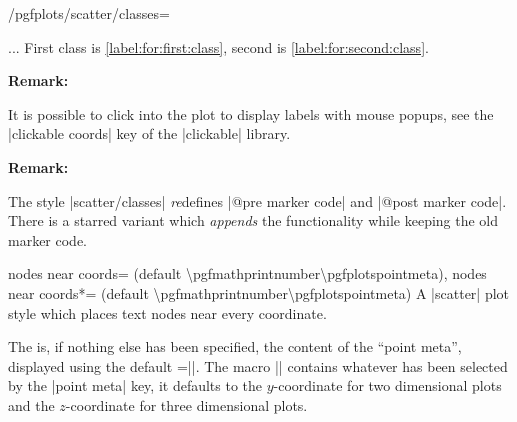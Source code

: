 {\begin{stylekey}{/pgfplots/scatter/classes=}
\begin{codeexample}
...
First class is \ref{label:for:first:class}, second is \ref{label:for:second:class}.
\end{codeexample}


    \textbf{Remark:}

    It is possible to click into the plot to display labels with mouse popups,
    see the |clickable coords| key of the |clickable| library.

    \textbf{Remark:}

    The style |scatter/classes| \emph{re}defines |@pre marker code| and
    |@post marker code|. There is a starred variant
     which \emph{appends} the functionality
    while keeping the old marker code.
\end{stylekey}

\begin{pgfplotskeylist}{%
    nodes near coords= (default \textbackslash pgfmathprintnumber\textbackslash pgfplotspointmeta),
    nodes near coords*= (default \textbackslash pgfmathprintnumber\textbackslash pgfplotspointmeta)%
}
\label{pgfplots:example:pointmeta:nodesnearcoords}
    A |scatter| plot style which places text nodes near every coordinate.

\begin{codeexample}[]
\end{codeexample}
    The  is, if nothing else has been specified, the content of
    the ``point meta'', displayed using the default
    =|\pgfmathprintnumber{\pgfplotspointmeta}|. The macro
    |\pgfplotspointmeta| contains whatever has been selected by the
    |point meta| key, it defaults to the $y$-coordinate for two dimensional
    plots and the $z$-coordinate for three dimensional plots.


\end{pgfplotskeylist}}
